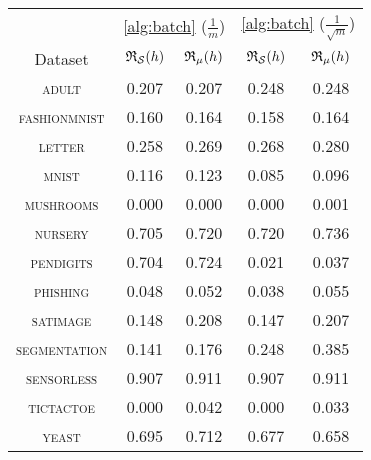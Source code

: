 \begin{tabular}{c|cc|cc}
\toprule
 & \multicolumn{2}{c}{\cref{alg:batch} {\small ($\frac{1}{m}$)}} & \multicolumn{2}{c}{\cref{alg:batch} {\small ($\frac{1}{\sqrt{m}}$)}} \\
Dataset & {\scriptsize $\mathfrak{R}_{\mathcal{S}}(h)$} & {\scriptsize $\mathfrak{R}_{\mu}(h)$} & {\scriptsize $\mathfrak{R}_{\mathcal{S}}(h)$} & {\scriptsize $\mathfrak{R}_{\mu}(h)$} \\
\midrule
\textsc{\footnotesize adult} & 0.207 & 0.207 & 0.248 & 0.248 \\
\textsc{\footnotesize fashionmnist} & 0.160 & 0.164 & 0.158 & 0.164 \\
\textsc{\footnotesize letter} & 0.258 & 0.269 & 0.268 & 0.280 \\
\textsc{\footnotesize mnist} & 0.116 & 0.123 & 0.085 & 0.096 \\
\textsc{\footnotesize mushrooms} & 0.000 & 0.000 & 0.000 & 0.001 \\
\textsc{\footnotesize nursery} & 0.705 & 0.720 & 0.720 & 0.736 \\
\textsc{\footnotesize pendigits} & 0.704 & 0.724 & 0.021 & 0.037 \\
\textsc{\footnotesize phishing} & 0.048 & 0.052 & 0.038 & 0.055 \\
\textsc{\footnotesize satimage} & 0.148 & 0.208 & 0.147 & 0.207 \\
\textsc{\footnotesize segmentation} & 0.141 & 0.176 & 0.248 & 0.385 \\
\textsc{\footnotesize sensorless} & 0.907 & 0.911 & 0.907 & 0.911 \\
\textsc{\footnotesize tictactoe} & 0.000 & 0.042 & 0.000 & 0.033 \\
\textsc{\footnotesize yeast} & 0.695 & 0.712 & 0.677 & 0.658 \\
\bottomrule
\end{tabular}
